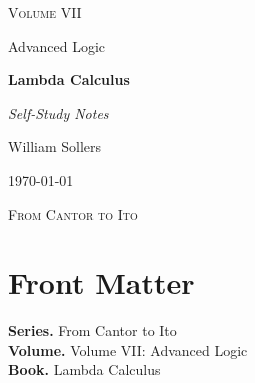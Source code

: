 \documentclass[12pt, a4paper]{report}
\begin{document}
\ExplSyntaxOff
\renewcommand{\familydefault}{\rmdefault}

\begin{titlepage}
\centering
\vspace*{3.5cm}

{\Large\scshape Volume VII\par}
\vspace{0.35cm}
{\large Advanced Logic\par}

\vspace{1.4cm}

{\Huge\bfseries Lambda Calculus\par}

\vspace{0.6cm}
{\large\itshape Self-Study Notes\par}

\vfill

{\large William Sollers\par}
\vspace{0.35cm}
{\large \today\par}

\vfill

{\large\scshape From Cantor to Ito\par}
\end{titlepage}

\clearpage
\thispagestyle{plain}
\chapter*{Front Matter}
\noindent\textbf{Series.} From Cantor to Ito\\[0.5em]
\textbf{Volume.} Volume VII: Advanced Logic\\[0.5em]
\textbf{Book.} Lambda Calculus

\clearpage
\tableofcontents
\clearpage
{}



\clearpage



\printindex[tech]
\printindex[dep]
\end{document}
